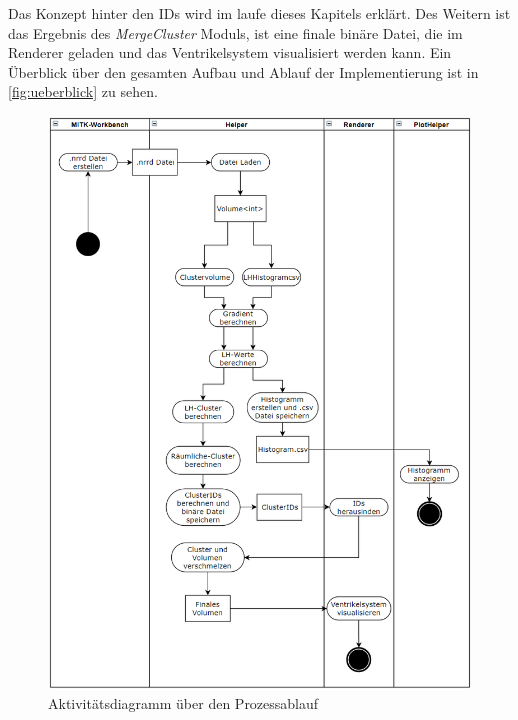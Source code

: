 Das Konzept hinter den IDs wird im laufe dieses Kapitels erklärt. Des Weitern ist das Ergebnis des \textit{MergeCluster} Moduls, ist eine finale binäre Datei, die im Renderer geladen und das Ventrikelsystem visualisiert werden kann. Ein Überblick über den gesamten Aufbau und Ablauf der Implementierung ist in  \autoref{fig:ueberblick} zu sehen.


\begin{figure}
\centering 
\includegraphics[width=\textwidth]{Logos/Ueberblick2.png}
\caption{Aktivitätsdiagramm über den Prozessablauf} 
\label{fig:ueberblick} 
\end{figure}


